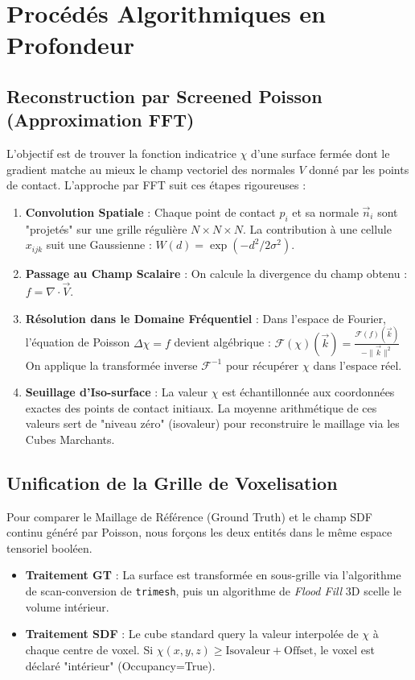 \documentclass[11pt, a4paper]{article}
\begin{document}
\section{Procédés Algorithmiques en Profondeur}

\subsection{Reconstruction par Screened Poisson (Approximation FFT)}
L'objectif est de trouver la fonction indicatrice $\chi$ d'une surface fermée dont le gradient matche au mieux le champ vectoriel des normales $V$ donné par les points de contact.
L'approche par FFT suit ces étapes rigoureuses :
\begin{enumerate}
    \item \textbf{Convolution Spatiale} : Chaque point de contact $p_i$ et sa normale $\vec{n}_i$ sont "projetés" sur une grille régulière $N \times N \times N$. La contribution à une cellule $x_{ijk}$ suit une Gaussienne : $W(d) = \exp(-d^2 / 2\sigma^2)$.
    \item \textbf{Passage au Champ Scalaire} : On calcule la divergence du champ obtenu : $f = \nabla \cdot \vec{V}$.
    \item \textbf{Résolution dans le Domaine Fréquentiel} : Dans l'espace de Fourier, l'équation de Poisson $\Delta\chi = f$ devient algébrique : 
    $ \mathcal{F}(\chi)(\vec{k}) = \frac{\mathcal{F}(f)(\vec{k})}{- \|\vec{k}\|^2} $
    On applique la transformée inverse $\mathcal{F}^{-1}$ pour récupérer $\chi$ dans l'espace réel.
    \item \textbf{Seuillage d'Iso-surface} : La valeur $\chi$ est échantillonnée aux coordonnées exactes des points de contact initiaux. La moyenne arithmétique de ces valeurs sert de "niveau zéro" (isovaleur) pour reconstruire le maillage via les Cubes Marchants.
\end{enumerate}

\subsection{Unification de la Grille de Voxelisation}
Pour comparer le Maillage de Référence (Ground Truth) et le champ SDF continu généré par Poisson, nous forçons les deux entités dans le même espace tensoriel booléen.
\begin{itemize}
    \item \textbf{Traitement GT} : La surface est transformée en sous-grille via l'algorithme de scan-conversion de \texttt{trimesh}, puis un algorithme de \textit{Flood Fill} 3D scelle le volume intérieur.
    \item \textbf{Traitement SDF} : Le cube standard query la valeur interpolée de $\chi$ à chaque centre de voxel. Si $\chi(x,y,z) \geq \text{Isovaleur} + \text{Offset}$, le voxel est déclaré "intérieur" (Occupancy=True).
\end{itemize}
\end{document}
